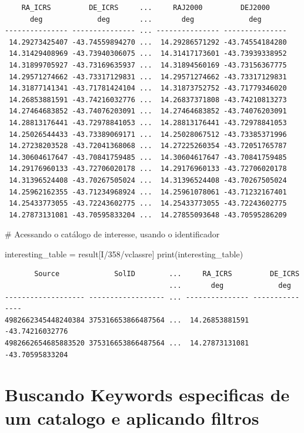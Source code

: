 \documentclass[
  letterpaper,
  DIV=11,
  numbers=noendperiod]{scrreprt}
\newenvironment{Shaded}{\begin{snugshade}}{\end{snugshade}}
\newcommand{\BuiltInTok}[1]{\textcolor[rgb]{0.00,0.23,0.31}{#1}}
\newcommand{\CommentTok}[1]{\textcolor[rgb]{0.37,0.37,0.37}{#1}}
\newcommand{\NormalTok}[1]{\textcolor[rgb]{0.00,0.23,0.31}{#1}}
\newcommand{\OperatorTok}[1]{\textcolor[rgb]{0.37,0.37,0.37}{#1}}
\newcommand{\StringTok}[1]{\textcolor[rgb]{0.13,0.47,0.30}{#1}}
\begin{document}
\begin{verbatim}
    RA_ICRS         DE_ICRS     ...     RAJ2000         DEJ2000    
      deg             deg       ...       deg             deg      
--------------- --------------- ... --------------- ---------------
 14.29273425407 -43.74559894270 ...  14.29286571292 -43.74554184280
 14.31429408969 -43.73940306075 ...  14.31417173601 -43.73939338952
 14.31899705927 -43.73169635937 ...  14.31894560169 -43.73156367775
 14.29571274662 -43.73317129831 ...  14.29571274662 -43.73317129831
 14.31877141341 -43.71781424104 ...  14.31873752752 -43.71779346020
 14.26853881591 -43.74216032776 ...  14.26837371808 -43.74210813273
 14.27464683852 -43.74076203091 ...  14.27464683852 -43.74076203091
 14.28813176441 -43.72978841053 ...  14.28813176441 -43.72978841053
 14.25026544433 -43.73389069171 ...  14.25028067512 -43.73385371996
 14.27238203528 -43.72041368068 ...  14.27225260354 -43.72051765787
 14.30604617647 -43.70841759485 ...  14.30604617647 -43.70841759485
 14.29176960133 -43.72706020178 ...  14.29176960133 -43.72706020178
 14.31396524408 -43.70267505024 ...  14.31396524408 -43.70267505024
 14.25962162355 -43.71234968924 ...  14.25961078061 -43.71232167401
 14.25433773055 -43.72243602775 ...  14.25433773055 -43.72243602775
 14.27873131081 -43.70595833204 ...  14.27855093648 -43.70595286209
\end{verbatim}

\begin{Shaded}
\begin{Highlighting}[]
\CommentTok{\# Acessando o catálogo de interesse, usando o identificador}

\NormalTok{interesting\_table }\OperatorTok{=}\NormalTok{ result[}\StringTok{\textquotesingle{}I/358/vclassre\textquotesingle{}}\NormalTok{]}
\BuiltInTok{print}\NormalTok{(interesting\_table)}
\end{Highlighting}
\end{Shaded}

\begin{verbatim}
       Source             SolID        ...     RA_ICRS         DE_ICRS    
                                       ...       deg             deg      
------------------- ------------------ ... --------------- ---------------
4982662345448240384 375316653866487564 ...  14.26853881591 -43.74216032776
4982662654685883520 375316653866487564 ...  14.27873131081 -43.70595833204
\end{verbatim}

\chapter{Buscando Keywords especificas de um catalogo e aplicando
filtros}\label{buscando-keywords-especificas-de-um-catalogo-e-aplicando-filtros}
\end{document}
